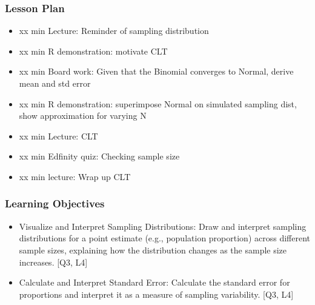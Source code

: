 

\begin{frame}
\frametitle{Lesson Plan}
\begin{itemize}
    \item xx min Lecture: Reminder of sampling distribution
    \item xx min R demonstration: motivate CLT
    \item xx min Board work: Given that the Binomial converges to Normal, derive mean and std error
    \item xx min R demonstration: superimpose Normal on simulated sampling dist, show approximation for varying N
    \item xx min Lecture: CLT
    \item xx min Edfinity quiz: Checking sample size
    \item xx min lecture: Wrap up CLT
 \end{itemize}
\end{frame}
    
\begin{frame}
\frametitle{Learning Objectives}
\begin{itemize}
    \item Visualize and Interpret Sampling Distributions: Draw and interpret sampling distributions for a point estimate (e.g., population proportion) across different sample sizes, explaining how the distribution changes as the sample size increases. [Q3, L4] 
    \item Calculate and Interpret Standard Error: Calculate the standard error for proportions and interpret it as a measure of sampling variability. [Q3, L4]
\end{itemize}
\end{frame}



